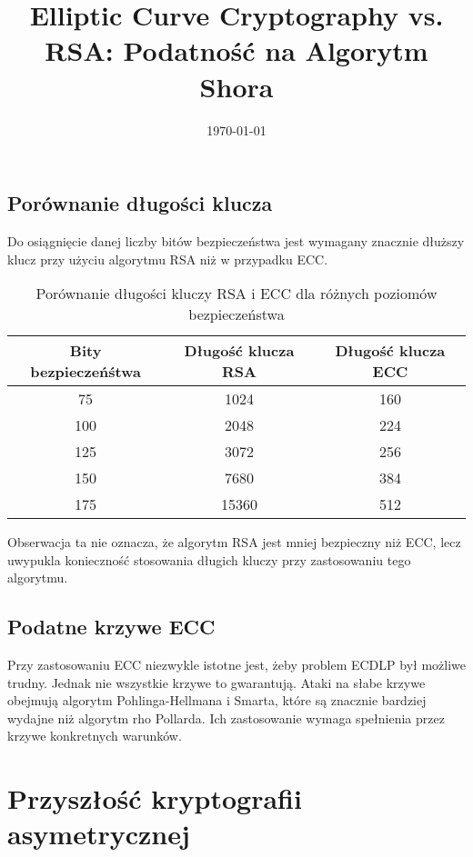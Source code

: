 \documentclass[conference]{IEEEtran}
\begin{document}
\subsection{Porównanie długości klucza}
Do osiągnięcie danej liczby bitów bezpieczeństwa jest wymagany znacznie dłuższy klucz przy użyciu algorytmu RSA niż w przypadku ECC.

\begin{table}[h]
    \centering
    \begin{tabular}{|c|c|c|}
        \hline
        \textbf{Bity bezpieczeńśtwa} & \textbf{Długość klucza RSA} & \textbf{Długość klucza ECC} \\
        \hline
        75  & 1024  & 160  \\
        100 & 2048  & 224  \\
        125 & 3072  & 256  \\
        150 & 7680  & 384  \\
        175 & 15360 & 512  \\
        \hline
    \end{tabular}
    \caption{Porównanie długości kluczy RSA i ECC dla różnych poziomów bezpieczeństwa}
    \label{tab:poziomy_bezpieczenstwa}
\end{table}

Obserwacja ta nie oznacza, że algorytm RSA jest mniej bezpieczny niż ECC, lecz uwypukla konieczność stosowania długich kluczy przy zastosowaniu tego algorytmu.

\subsection{Podatne krzywe ECC}

Przy zastosowaniu ECC niezwykle istotne jest, żeby problem ECDLP był możliwe trudny.
Jednak nie wszystkie krzywe to gwarantują. Ataki na słabe krzywe obejmują \cite{WeakCurvesInEllipticCurveCryptography} algorytm Pohlinga-Hellmana i Smarta, które są znacznie bardziej wydajne niż algorytm rho Pollarda. Ich zastosowanie wymaga spełnienia przez krzywe konkretnych warunków.

\section{Przyszłość kryptografii asymetrycznej}
\title{Elliptic Curve Cryptography vs. RSA: Podatność na Algorytm Shora}
\author{}
\date{\today}
\end{document}
